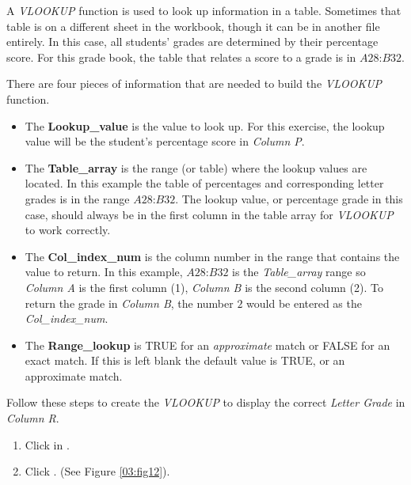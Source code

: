 A \textit{VLOOKUP} function is used to look up information in a table. Sometimes that table is on a different sheet in the workbook, though it can be in another file entirely. In this case, all students' grades are determined by their percentage score. For this grade book, the table that relates a score to a grade is in $ A28 $:$ B32 $.

There are four pieces of information that are needed to build the \textit{VLOOKUP} function. 

\begin{itemize}
	\item The \textbf{Lookup\_value} is the value to look up. For this exercise, the lookup value will be the student's percentage score in \textit{Column P}.
	\item The \textbf{Table\_array} is the range (or table) where the lookup values are located. In this example the table of percentages and corresponding letter grades is in the range $ A28 $:$ B32 $. The lookup value, or percentage grade in this case, should always be in the first column in the table array for \textit{VLOOKUP} to work correctly. 
	\item The \textbf{Col\_index\_num} is the column number in the range that contains the value to return. In this example, $ A28 $:$ B32 $ is the \textit{Table\_array} range so \textit{Column A} is the first column (1), \textit{Column B} is the second column (2). To return the grade in \textit{Column B}, the number $ 2 $ would be entered as the \textit{Col\_index\_num}.
	\item The \textbf{Range\_lookup} is TRUE for an \textit{approximate} match or FALSE for an exact match. If this is left blank the default value is TRUE, or an approximate match.
\end{itemize}

Follow these steps to create the \textit{VLOOKUP} to display the correct \textit{Letter Grade} in \textit{Column R}.

\begin{enumerate}
	\item Click in .
	\item Click . (See Figure \ref{03:fig12}).
\end{enumerate}

